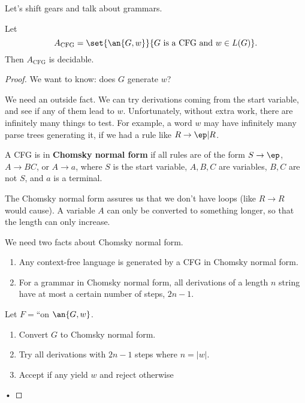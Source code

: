 Let's shift gears and talk about grammars.
\begin{thm}
Let 
\[
A_{\text{CFG}}=\set{\an{G,w}}{G\text{ is a CFG and }w\in L(G)}.
\]
Then $A_{\text{CFG}}$ is decidable.
\end{thm}
\begin{proof}
We want to know: does $G$ generate $w$?

We need an outside fact. We can try derivations coming from the start variable, and see if any of them lead to $w$. Unfortunately, without extra work, there are infinitely many things to test. For example, a word $w$ may have infinitely many parse trees generating it, if we had a rule like $R\to \ep|R$.


\begin{df}
A CFG is in \textbf{Chomsky normal form} if all rules are of the form $S\to \ep$, $A\to BC$, or $A\to a$, where $S$ is the start variable, $A,B,C$ are variables, $B,C$ are not $S$, and $a$ is a terminal.
\end{df}
The Chomsky normal form assures us that we don't have loops (like $R\to R$ would cause). A variable $A$ can only be converted to something longer, so that the length can only increase.

We need two facts about Chomsky normal form.
\begin{thm}
\begin{enumerate}
\item
Any context-free language is generated by a CFG in Chomsky normal form. 
\item
For a grammar in Chomsky normal form, all derivations of a length $n$ string have at most a certain number of steps, $2n-1$. 
\end{enumerate}
\end{thm}


Let $F=$``on $\an{G,w}$.
\begin{enumerate}
\item
Convert $G$ to Chomsky normal form.
\item
Try all derivations with $2n-1$ steps where $n=|w|$.
\item 
Accept if any yield $w$ and reject otherwise
\end{enumerate}•
\end{proof}
